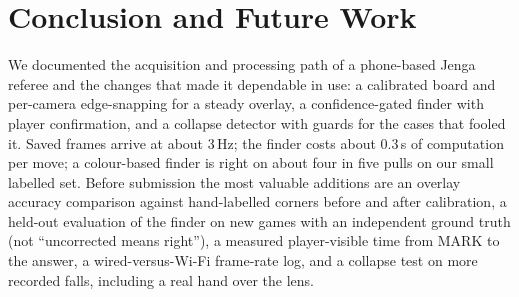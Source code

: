 \documentclass[conference,10pt]{IEEEtran}
\begin{document}
\section{Conclusion and Future Work}
We documented the acquisition and processing path of a phone-based Jenga referee and the changes that made it dependable in use: a calibrated board and per-camera edge-snapping for a steady overlay, a confidence-gated finder with player confirmation, and a collapse detector with guards for the cases that fooled it. Saved frames arrive at about 3\,Hz; the finder costs about 0.3\,s of computation per move; a colour-based finder is right on about four in five pulls on our small labelled set. Before submission the most valuable additions are an overlay accuracy comparison against hand-labelled corners before and after calibration, a held-out evaluation of the finder on new games with an independent ground truth (not ``uncorrected means right''), a measured player-visible time from MARK to the answer, a wired-versus-Wi-Fi frame-rate log, and a collapse test on more recorded falls, including a real hand over the lens.



\end{document}
